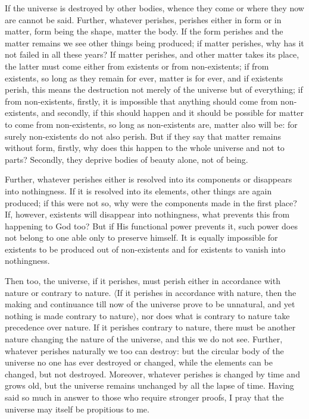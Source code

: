 \documentclass[12pt]{article}
\begin{document}
If the universe is destroyed by other bodies, whence they come or where they
now are cannot be said. Further, whatever perishes, perishes either in form or
in matter, form being the shape, matter the body. If the form perishes and the
matter remains we see other things being produced; if matter perishes, why has
it not failed in all these years? If matter perishes, and other matter takes
its place, the latter must come either from existents or from non-existents; if
from existents, so long as they remain for ever, matter is for ever, and if
existents perish, this means the destruction not merely of the universe but of
everything; if from non-existents, firstly, it is impossible that anything
should come from non-existents, and secondly, if this should happen and it
should be possible for matter to come from non-existents, so long as
non-existents are, matter also will be: for surely non-existents do not also
perish. But if they say that matter remains without form, firstly, why does
this happen to the whole universe and not to parts? Secondly, they deprive
bodies of beauty alone, not of being.

Further, whatever perishes either is resolved into its components or disappears
into nothingness. If it is resolved into its elements, other things are again
produced; if this were not so, why were the components made in the first place?
If, however, existents will disappear into nothingness, what prevents this from
happening to God too? But if His functional power prevents it, such power does
not belong to one able only to preserve himself. It is equally impossible for
existents to be produced out of non-existents and for existents to vanish into
nothingness.

Then too, the universe, if it perishes, must perish either in accordance with
nature or contrary to nature. $\langle$If it perishes in accordance with
nature, then the making and continuance till now of the universe prove to be
unnatural, and yet nothing is made contrary to nature$\rangle$, nor does what
is contrary to nature take precedence over nature. If it perishes contrary to
nature, there must be another nature changing the nature of the universe, and
this we do not see. Further, whatever perishes naturally we too can destroy:
but the circular body of the universe no one has ever destroyed or changed,
while the elements can be changed, but not destroyed. Moreover, whatever
perishes is changed by time and grows old, but the universe remains unchanged
by all the lapse of time. Having said so much in answer to those who require
stronger proofs, I pray that the universe may itself be propitious to me.
\end{document}
